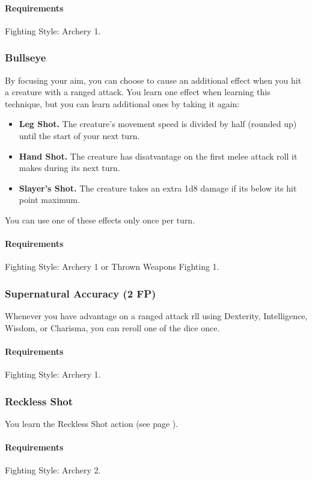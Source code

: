     \paragraph{Requirements} Fighting Style: Archery 1.
\subsubsection{Bullseye} \label{feat::bullseye}
    By focusing your aim, you can choose to cause an additional effect when you hit a creature with a ranged attack.
    You learn one effect when learning this technique, but you can learn additional ones by taking it again:
    \begin{itemize}
        \item \textbf{Leg Shot.} The creature's movement speed is divided by half (rounded up) until the start of your next turn.
        \item \textbf{Hand Shot.} The creature has disatvantage on the first melee attack roll it makes during its next turn.
        \item \textbf{Slayer's Shot.} The creature takes an extra 1d8 damage if its below its hit point maximum.
    \end{itemize}

    You can use one of these effects only once per turn.
    \paragraph{Requirements} Fighting Style: Archery 1 or Thrown Weapons Fighting 1.
\subsubsection{Supernatural Accuracy (2 FP)} \label{feat::supernaturalaccuracy}
    Whenever you have advantage on a ranged attack rll using Dexterity, Intelligence, Wisdom, or Charisma, you can reroll one of the dice once.
    \paragraph{Requirements} Fighting Style: Archery 1.
\subsubsection{Reckless Shot} \label{feat::recklessshot}
    You learn the Reckless Shot action (see page \pageref{act::recklessshot}).
    \paragraph{Requirements} Fighting Style: Archery 2.
